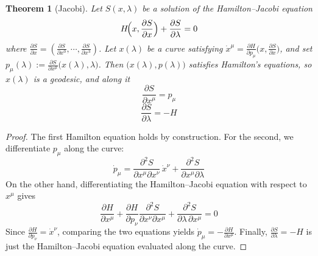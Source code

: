 \documentclass{article}
\newtheorem{theorem}{Theorem}[section]
\theoremstyle{remark}
\begin{document}
\begin{theorem}[Jacobi]\label{thm:jacobi}
    Let $S(x,\lambda)$ be a solution of the Hamilton--Jacobi equation
    \begin{equation}
        H\!\Bigl(x, \frac{\partial S}{\partial x}\Bigr)
        + \frac{\partial S}{\partial \lambda} = 0
    \end{equation}
    where $\frac{\partial S}{\partial x}=(\frac{\partial S}{\partial x^0},\cdots,\frac{\partial S}{\partial x^3})$. Let $x(\lambda)$ be a curve satisfying $\dot{x}^{\mu} = \frac{\partial H}{\partial p_{\mu}}\bigl(x, \frac{\partial S}{\partial x}\bigr)$, and set $p_{\mu}(\lambda) := \frac{\partial S}{\partial x^{\mu}}\bigl(x(\lambda),\lambda\bigr)$. Then $\bigl(x(\lambda), p(\lambda)\bigr)$ satisfies Hamilton's equations, so $x(\lambda)$ is a geodesic, and along it
    \begin{equation}
        \frac{\partial S}{\partial x^{\mu}} = p_{\mu}
    \end{equation}
    \begin{equation}
        \frac{\partial S}{\partial \lambda} = -H
    \end{equation}
\end{theorem}
\begin{proof}
    The first Hamilton equation holds by construction. For the second, we differentiate $p_{\mu}$ along the curve:
    \begin{equation}
        \dot{p}_{\mu} = \frac{\partial^2 S}{\partial x^{\mu}\partial x^{\nu}}\,\dot{x}^{\nu} + \frac{\partial^2 S}{\partial x^{\mu}\partial \lambda}
    \end{equation}
    On the other hand, differentiating the Hamilton--Jacobi equation with respect to $x^{\mu}$ gives
    \begin{equation}
        \frac{\partial H}{\partial x^{\mu}} + \frac{\partial H}{\partial p_{\nu}}\frac{\partial^2 S}{\partial x^{\nu}\partial x^{\mu}} + \frac{\partial^2 S}{\partial \lambda\,\partial x^{\mu}} = 0
    \end{equation}
    Since $\frac{\partial H}{\partial p_{\nu}} = \dot{x}^{\nu}$, comparing the two equations yields $\dot{p}_{\mu} = -\frac{\partial H}{\partial x^{\mu}}$. Finally, $\frac{\partial S}{\partial \lambda} = -H$ is just the Hamilton--Jacobi equation evaluated along the curve.
\end{proof}
\end{document}
